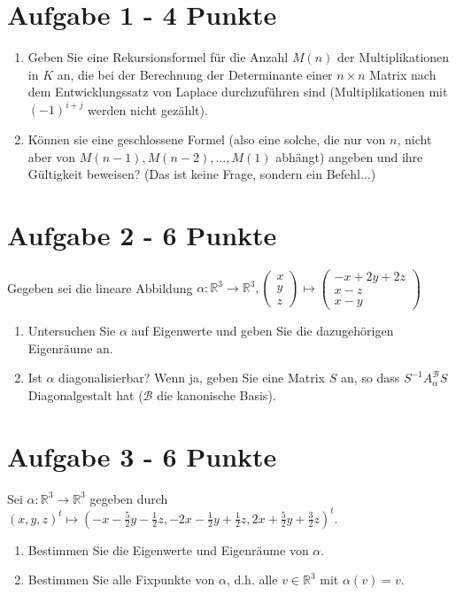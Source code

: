 
\section*{Aufgabe 1 - 4 Punkte}
\begin{enumerate}[label=\alph*)]
\item Geben Sie eine Rekursionsformel für die Anzahl $M(n)$ der Multiplikationen in $K$ an, die bei der Berechnung der Determinante einer $n \times n$ Matrix nach dem Entwicklungssatz von Laplace durchzuführen sind (Multiplikationen mit $(-1)^{i+j}$ werden nicht gezählt).
\item Können sie eine geschlossene Formel (also eine solche, die nur von $n$, nicht aber von $M(n-1), M(n-2),...,M(1)$ abhängt) angeben und ihre Gültigkeit beweisen? (Das ist keine Frage, sondern ein Befehl...)\\


\end{enumerate}
\section*{Aufgabe 2 - 6 Punkte}
Gegeben sei die lineare Abbildung $\alpha: \mathbb{R}^3 \rightarrow \mathbb{R}^3, \begin{pmatrix} x\\y\\ z\end{pmatrix} \mapsto \begin{pmatrix} -x + 2y + 2z\\ x-z\\ x-y \end{pmatrix}$
\begin{enumerate}[label=\alph*)]
\item Untersuchen Sie $\alpha$ auf Eigenwerte und geben Sie die dazugehörigen Eigenräume an.
\item  Ist $\alpha$ diagonalisierbar? Wenn ja, geben Sie eine Matrix $S$ an, so dass $S^{-1}A_{\alpha}^{\mathcal{B}}S $Diagonalgestalt hat ($\mathcal{B}$ die kanonische Basis).
\end{enumerate}

\section*{Aufgabe 3 - 6 Punkte}
Sei $\alpha : \mathbb{R}^3 \rightarrow \mathbb{R}^3$ gegeben durch $(x,y,z)^t \mapsto (-x- \frac{5}{2}y - \frac{1}{2}z, -2x - \frac{1}{2}y + \frac{1}{2}z, 2x + \frac{5}{2}y + \frac{3}{2}z)^t$.
\begin{enumerate}[label=\alph*)]
\item Bestimmen Sie die Eigenwerte und Eigenräume von $\alpha$.
\item Bestimmen Sie alle Fixpunkte von $\alpha$, d.h. alle $v \in \mathbb{R}^3$ mit $\alpha(v) = v$.
\end{enumerate}
